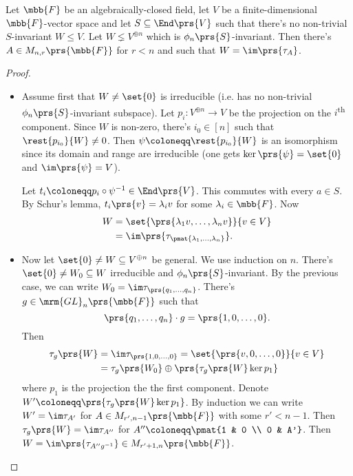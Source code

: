 \documentclass[10pt,a4paper,twoside,openany,hidelinks]{book}
\begin{document}
\begin{lemma}\label{lemma:density}
Let $\mbb{F}$ be an algebraically-closed field, let $V$ be a finite-dimensional $\mbb{F}$-vector space and let $S \subseteq \End\prs{V}$ such that there's no non-trivial $S$-invariant $W \leq V$.
Let $W \lneq V^{\oplus n}$ which is $\phi_n\prs{S}$-invariant. Then there's $A \in M_{n,r}\prs{\mbb{F}}$ for $r < n$ and such that $W = \im\prs{\tau_A}$.
\end{lemma}

\begin{proof}
\begin{itemize}
\item Assume first that $W \neq \set{0}$ is irreducible (i.e. has no non-trivial $\phi_n\prs{S}$-invariant subspace).
Let $p_i \colon V^{\oplus n} \to V$ be the projection on the $i$\textsuperscript{th} component.
Since $W$ is non-zero, there's $i_0 \in [n]$ such that $\rest{p_{i_0}}{W} \neq 0$. Then $\psi \coloneqq \rest{p_{i_0}}{W}$ is an isomorphism since its domain and range are irreducible (one gets $\ker\prs{\psi} = \set{0}$ and $\im\prs{\psi} = V$).

Let $t_i \coloneqq p_i \circ \psi^{-1} \in \End\prs{V}$. This commutes with every $a \in S$. By Schur's lemma, $t_i\prs{v} = \lambda_i v$ for some $\lambda_i \in \mbb{F}$. Now
\begin{align*}
W &= \set{\prs{\lambda_1 v, \ldots, \lambda_n v}}{v \in V}
\\&= \im \prs{\tau_{\pmat{\lambda_1, \ldots, \lambda_n}}} \text{.}
\end{align*}

\item 
Now let $\set{0} \neq W \subseteq V^{\oplus n}$ be general. We use induction on $n$.
There's $\set{0} \neq W_0 \subseteq W$ irreducible and $\phi_n\prs{S}$-invariant.
By the previous case, we can write $W_0 = \im \tau_{\prs{q_1, \ldots, q_n}}$. There's $g \in \mrm{GL}_n\prs{\mbb{F}}$ such that
\[\prs{q_1, \ldots, q_n} \cdot g = \prs{1, 0, \ldots, 0} \text{.}\]
Then
\begin{align*}
\tau_g\prs{W} &= \im \tau_{\prs{1, 0, \ldots, 0}} = \set{\prs{v,0,\ldots,0}}{v \in V}
\\&= \tau_g\prs{W_0} \oplus \prs{\tau_g\prs{W} \ker p_1}
\end{align*}
where
$p_1$ is the projection the the first component.
Denote $W' \coloneqq \prs{\tau_g\prs{W} \ker p_1}$. By induction we can write $W' = \im\tau_{A'}$ for $A \in M_{r', n-1}\prs{\mbb{F}}$ with some $r' < n-1$. Then $\tau_g\prs{W} = \im \tau_{A''}$ for $A'' \coloneqq \pmat{1 & 0 \\ 0 & A'}$.
Then $W = \im \prs{\tau_{A'' g^{-1}}} \in M_{r'+1, n} \prs{\mbb{F}}$.
\end{itemize}
\end{proof}
\end{document}
